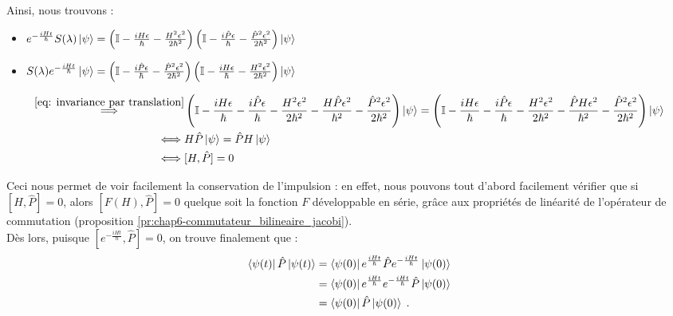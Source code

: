 \documentclass[../notesdecours]{subfiles}
\begin{document}
Ainsi, nous trouvons : 
\begin{itemize}[label = \textbullet]
    \item $ e^{-\frac{iHt}{\hbar}} S(\lambda) \ket{\psi} = \left( \mathbb{I} - \frac{iH\epsilon}{\hbar} - \frac{H^2 \epsilon^2}{2\hbar^2} \right) \left( \mathbb{I} - \frac{i\hat{P}\epsilon}{\hbar} - \frac{\hat{P}^2\epsilon^2}{2\hbar^2} \right) \ket{\psi}$ 
    \item $ S(\lambda) e^{-\frac{iHt}{\hbar}} \ket{\psi} = \left( \mathbb{I} - \frac{i\hat{P}\epsilon}{\hbar} - \frac{\hat{P}^2\epsilon^2}{2\hbar^2} \right)\left( \mathbb{I} - \frac{iH\epsilon}{\hbar} - \frac{H^2 \epsilon^2}{2\hbar^2} \right) \ket{\psi} $
\end{itemize}
    
\begin{align}
    \stackrel{\eqref{eq: invariance par translation}}{\implies} &\left( \mathbb{I} - \frac{iH\epsilon}{\hbar} - \frac{i\hat{P}\epsilon}{\hbar} - \frac{H^2\epsilon^2}{2\hbar^2} - \frac{H \hat{P}\epsilon^2}{\hbar^2}- \frac{\hat{P}^2 \epsilon^2}{2\hbar^2} \right) \ket{\psi} = \left( \mathbb{I} - \frac{iH\epsilon}{\hbar} - \frac{i\hat{P}\epsilon}{\hbar} - \frac{H^2\epsilon^2}{2\hbar^2} - \frac{\hat{P} H\epsilon^2}{\hbar^2}- \frac{\hat{P}^2 \epsilon^2}{2\hbar^2} \right) \ket{\psi} \notag\\
    \iff & H\hat{P} \ket{\psi} = \hat{P} H \ket{\psi} \notag \\
    \iff & [H, \hat{P}] = 0 \label{eq: commutateur invariance par translation}
\end{align} 

Ceci nous permet de voir facilement la conservation de l'impulsion : en effet, nous pouvons tout d'abord facilement vérifier que si $[H, \hat{P}] = 0$, alors $[F(H),\hat{P}] = 0$ quelque soit la fonction $F$ développable en série, grâce aux propriétés de linéarité de l'opérateur de commutation (proposition \ref{pr:chap6-commutateur_bilineaire_jacobi}). \\

Dès lors, puisque $[e^{-\frac{iHt}{\hbar}}, \hat{P}] = 0$, on trouve finalement que : 
\begin{align}
    \bra{\psi (t)} \hat{P} \ket{\psi (t)} &= \bra{\psi(0)} e^{\frac{iHt}{\hbar}} \hat{P} e^{-\frac{iHt}{\hbar}} \ket{\psi (0)} \notag \\
    & = \bra{\psi (0)} e^{\frac{iHt}{\hbar}}e^{-\frac{iHt}{\hbar}} \hat{P} \ket{\psi (0)} \notag \\
    &= \bra{\psi(0)} \hat{P} \ket{\psi (0)} \; .
\end{align}
\end{document}
